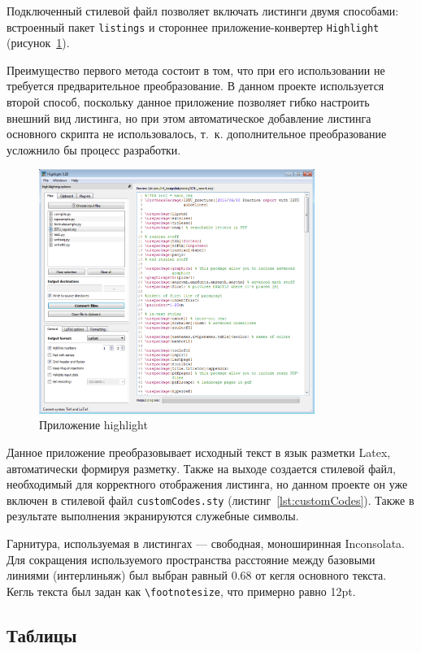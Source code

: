 Подключенный стилевой файл позволяет включать листинги двумя способами: встроенный пакет \texttt{listings} и стороннее приложение-конвертер \texttt{Highlight} (рисунок~\ref{fig:highlight}).

Преимущество первого метода состоит в том, что при его использовании не требуется предварительное преобразование. В данном проекте используется второй способ, поскольку данное приложение позволяет гибко настроить внешний вид листинга, но при этом автоматическое добавление листинга основного скрипта не использовалось, т.~к. дополнительное преобразование усложнило бы процесс разработки.

\begin{figure}[H]
	\centering
	\includegraphics[width=0.8\textwidth]{pics/highlight.png}
	\caption{Приложение highlight}
	\label{fig:highlight}
\end{figure}

Данное приложение преобразовывает исходный текст в язык разметки Latex, автоматически формируя разметку. Также на выходе создается стилевой файл, необходимый для корректного отображения листинга, но данном проекте он уже включен в стилевой файл \texttt{customCodes.sty} (листинг~\ref{lst:customCodes}). Также в результате выполнения экранируются служебные символы.

Гарнитура, используемая в листингах --- свободная, моноширинная Inconsolata. Для сокращения используемого пространства расстояние между базовыми линиями (интерлиньяж) был выбран равный 0.68 от кегля основного текста. Кегль текста был задан как \texttt{\textbackslash footnotesize}, что примерно равно 12pt.

\subsection{Таблицы}
\label{sec:tables}

